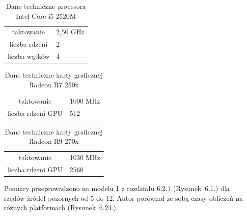 \begin{table}[H]
        \centering
        \begin{threeparttable}
                \caption{Dane techniczne procesora Intel Core i5-2520M}\label{tab:table_example}
                \begin{tabularx}{0.6\textwidth}{| c | X |}
                       \midrule
		taktowanie & 2,50 GHz \\
                     liczba rdzeni & 2 \\
                    liczba wątków & 4 \\
                        \bottomrule
                \end{tabularx}
        \end{threeparttable}
\end{table}

\begin{table}[H]
        \centering
        \begin{threeparttable}
                \caption{Dane techniczne karty graficznej Radeon R7 250x}\label{tab:table_example}
                \begin{tabularx}{0.6\textwidth}{| c | X |}
                       \midrule
		taktowanie & 1000 MHz \\
                     liczba rdzeni GPU & 512 \\
                        \bottomrule
                \end{tabularx}
        \end{threeparttable}
\end{table}

\begin{table}[H]
        \centering
        \begin{threeparttable}
                \caption{Dane techniczne karty graficznej Radeon R9 270x}\label{tab:table_example}
                \begin{tabularx}{0.6\textwidth}{| c | X |}
                       \midrule
		taktowanie & 1030 MHz \\
                     liczba rdzeni GPU & 2560 \\
                        \bottomrule
                \end{tabularx}
        \end{threeparttable}
\end{table}

Pomiary przeprowadzono na modelu 1 z rozdziału 6.2.1 (Rysunek~6.1.) dla rzędów źródeł pozornych od 5 do 12. Autor porównał ze sobą czasy obliczeń na różnych platformach (Rysunek~6.24.).

